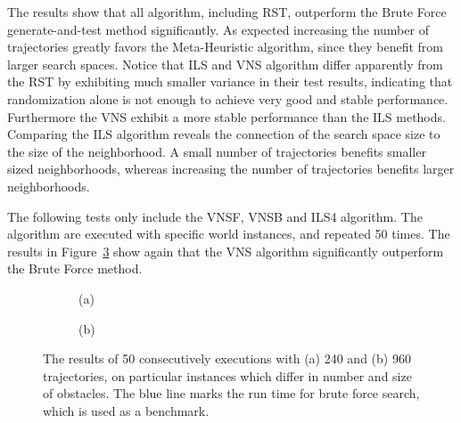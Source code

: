  
The results show that all algorithm, including RST, outperform the Brute Force generate-and-test method significantly. 
As expected increasing the number of trajectories greatly favors the Meta-Heuristic algorithm, since they benefit from larger search spaces. 
Notice that ILS and VNS algorithm differ apparently from the RST by exhibiting much smaller variance in their test results, indicating that randomization alone is not enough to achieve very good and stable performance.
Furthermore the VNS exhibit a more stable performance than the ILS methods. 
Comparing the ILS algorithm reveals the connection of the search space size to the size of the neighborhood. 
A small number of trajectories benefits smaller sized neighborhoods, whereas increasing the number of trajectories benefits larger neighborhoods. 

The following tests only include the VNSF, VNSB and ILS4 algorithm. 
The algorithm are executed with specific world instances, and repeated 50 times. 
The results in Figure~\ref{fig:fig_special} show again that the VNS algorithm significantly outperform the Brute Force method. 

\begin{figure}[thb]
   \captionsetup[subfigure]{labelformat=empty} 
   \begin{subfigure}{0.7\textwidth}
        \footnotesize
      \centering
      \def\svgwidth{\columnwidth}
      
      \caption{(a)}
      \label{fig:fig_6_40}
    \end{subfigure}
    
    \begin{subfigure}{0.7\textwidth}  
      \footnotesize
      \centering
      \def\svgwidth{\columnwidth}
      
      \caption{(b)}
      \label{fig:fig_12_80}
    \end{subfigure}
    \caption{The results of 50 consecutively executions with (a) 240 and (b) 960 trajectories, on particular instances which differ in number and size of obstacles. The blue line marks the run time for brute force search, which is used as a benchmark.}  
     \label{fig:fig_special}
\end{figure}

